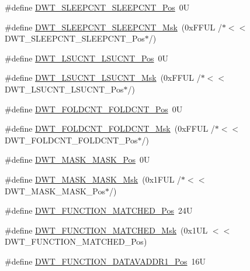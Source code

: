 \begin{DoxyCompactItemize}
\item 
\#define \hyperlink{group___c_m_s_i_s___d_w_t_ga0371a84a7996dc5852c56afb2676ba1c}{D\+W\+T\+\_\+\+S\+L\+E\+E\+P\+C\+N\+T\+\_\+\+S\+L\+E\+E\+P\+C\+N\+T\+\_\+\+Pos}~0U
\item 
\#define \hyperlink{group___c_m_s_i_s___d_w_t_ga1e340751d71413fef400a0a1d76cc828}{D\+W\+T\+\_\+\+S\+L\+E\+E\+P\+C\+N\+T\+\_\+\+S\+L\+E\+E\+P\+C\+N\+T\+\_\+\+Msk}~(0x\+F\+F\+U\+L /$\ast$$<$$<$ D\+W\+T\+\_\+\+S\+L\+E\+E\+P\+C\+N\+T\+\_\+\+S\+L\+E\+E\+P\+C\+N\+T\+\_\+\+Pos$\ast$/)
\item 
\#define \hyperlink{group___c_m_s_i_s___d_w_t_gab9394c7911b0b4312a096dad91d53a3d}{D\+W\+T\+\_\+\+L\+S\+U\+C\+N\+T\+\_\+\+L\+S\+U\+C\+N\+T\+\_\+\+Pos}~0U
\item 
\#define \hyperlink{group___c_m_s_i_s___d_w_t_ga2186d7fc9317e20bad61336ee2925615}{D\+W\+T\+\_\+\+L\+S\+U\+C\+N\+T\+\_\+\+L\+S\+U\+C\+N\+T\+\_\+\+Msk}~(0x\+F\+F\+U\+L /$\ast$$<$$<$ D\+W\+T\+\_\+\+L\+S\+U\+C\+N\+T\+\_\+\+L\+S\+U\+C\+N\+T\+\_\+\+Pos$\ast$/)
\item 
\#define \hyperlink{group___c_m_s_i_s___d_w_t_ga7f8af5ac12d178ba31a516f6ed141455}{D\+W\+T\+\_\+\+F\+O\+L\+D\+C\+N\+T\+\_\+\+F\+O\+L\+D\+C\+N\+T\+\_\+\+Pos}~0U
\item 
\#define \hyperlink{group___c_m_s_i_s___d_w_t_ga9cb73d0342d38b14e41027d3c5c02647}{D\+W\+T\+\_\+\+F\+O\+L\+D\+C\+N\+T\+\_\+\+F\+O\+L\+D\+C\+N\+T\+\_\+\+Msk}~(0x\+F\+F\+U\+L /$\ast$$<$$<$ D\+W\+T\+\_\+\+F\+O\+L\+D\+C\+N\+T\+\_\+\+F\+O\+L\+D\+C\+N\+T\+\_\+\+Pos$\ast$/)
\item 
\#define \hyperlink{group___c_m_s_i_s___d_w_t_gaf798ae34e2b9280ea64f4d9920cd2e7d}{D\+W\+T\+\_\+\+M\+A\+S\+K\+\_\+\+M\+A\+S\+K\+\_\+\+Pos}~0U
\item 
\#define \hyperlink{group___c_m_s_i_s___d_w_t_gadd798deb0f1312feab4fb05dcddc229b}{D\+W\+T\+\_\+\+M\+A\+S\+K\+\_\+\+M\+A\+S\+K\+\_\+\+Msk}~(0x1\+F\+U\+L /$\ast$$<$$<$ D\+W\+T\+\_\+\+M\+A\+S\+K\+\_\+\+M\+A\+S\+K\+\_\+\+Pos$\ast$/)
\item 
\#define \hyperlink{group___c_m_s_i_s___d_w_t_ga22c5787493f74a6bacf6ffb103a190ba}{D\+W\+T\+\_\+\+F\+U\+N\+C\+T\+I\+O\+N\+\_\+\+M\+A\+T\+C\+H\+E\+D\+\_\+\+Pos}~24U
\item 
\#define \hyperlink{group___c_m_s_i_s___d_w_t_gac8b1a655947490280709037808eec8ac}{D\+W\+T\+\_\+\+F\+U\+N\+C\+T\+I\+O\+N\+\_\+\+M\+A\+T\+C\+H\+E\+D\+\_\+\+Msk}~(0x1\+U\+L $<$$<$ D\+W\+T\+\_\+\+F\+U\+N\+C\+T\+I\+O\+N\+\_\+\+M\+A\+T\+C\+H\+E\+D\+\_\+\+Pos)
\item 
\#define \hyperlink{group___c_m_s_i_s___d_w_t_ga8b75e8ab3ffd5ea2fa762d028dc30e8c}{D\+W\+T\+\_\+\+F\+U\+N\+C\+T\+I\+O\+N\+\_\+\+D\+A\+T\+A\+V\+A\+D\+D\+R1\+\_\+\+Pos}~16U
$$
\end{DoxyCompactItemize}
